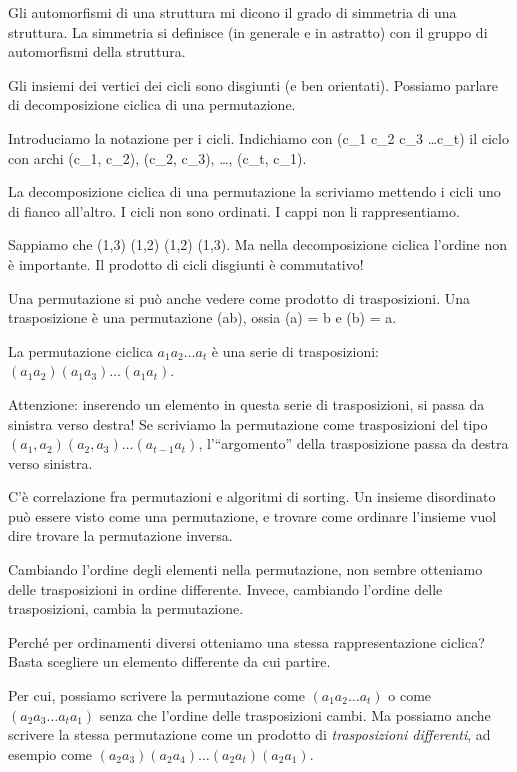 Gli automorfismi di una struttura mi dicono il grado di simmetria di una struttura.
La simmetria si definisce (in generale e in astratto) con il gruppo di automorfismi della struttura.

Gli insiemi dei vertici dei cicli sono disgiunti (e ben orientati).
Possiamo parlare di decomposizione ciclica di una permutazione.

Introduciamo la notazione per i cicli.
Indichiamo con (c_1 c_2 c_3 \dots c_t) il ciclo con archi (c_1, c_2), (c_2, c_3), \dots, (c_t, c_1).

La decomposizione ciclica di una permutazione la scriviamo mettendo i cicli uno di fianco all'altro.
I cicli non sono ordinati.
I cappi non li rappresentiamo.

Sappiamo che (1,3) (1,2) \neq (1,2) (1,3).
Ma nella decomposizione ciclica l'ordine non \`e importante.
Il prodotto di cicli disgiunti \`e commutativo!

Una permutazione si pu\`o anche vedere come prodotto di trasposizioni.
Una trasposizione \tau \`e una permutazione (ab), ossia \tau(a) = b e \tau(b) = a.

\begin{oss}
	La permutazione ciclica $a_1 a_2 \dots a_t$ \`e una serie di trasposizioni: $(a_1 a_2) (a_1 a_3) \dots (a_1 a_t)$.
\end{oss}

Attenzione: inserendo un elemento in questa serie di trasposizioni, si passa da sinistra verso destra!
Se scriviamo la permutazione come trasposizioni del tipo $(a_1, a_2) (a_2, a_3) \dots (a_{t-1} a_{t})$, l'``argomento'' della trasposizione passa da destra verso sinistra.

C'\`e correlazione fra permutazioni e algoritmi di sorting.
Un insieme disordinato pu\`o essere visto come una permutazione, e trovare come ordinare l'insieme vuol dire trovare la permutazione inversa.

Cambiando l'ordine degli elementi nella permutazione, non sembre otteniamo delle trasposizioni in ordine differente.
Invece, cambiando l'ordine delle trasposizioni, cambia la permutazione.

Perch\'e per ordinamenti diversi otteniamo una stessa rappresentazione ciclica?
Basta scegliere un elemento differente da cui partire.

Per cui, possiamo scrivere la permutazione come $(a_1 a_2 \dots a_t)$ o come $(a_2 a_3 \dots a_t a_1)$ senza che l'ordine delle trasposizioni cambi.
Ma possiamo anche scrivere la stessa permutazione come un prodotto di \emph{trasposizioni differenti}, ad esempio come $(a_2 a_3) (a_2 a_4) \dots (a_2 a_t) (a_2 a_1)$.


